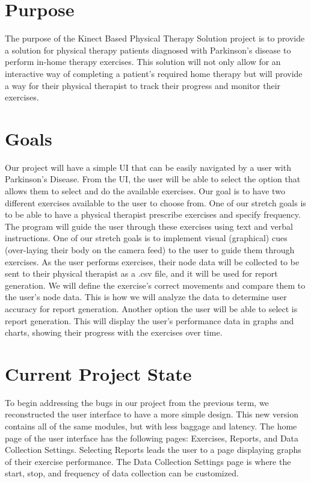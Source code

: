 \documentclass[onecolumn, draftclsnofoot,10pt, compsoc]{IEEEtran}
\begin{document}
\section{Purpose}
The purpose of the Kinect Based Physical Therapy Solution project is to provide a solution for physical therapy patients diagnosed with Parkinson's disease to perform in-home therapy exercises. This solution will not only allow for an interactive way of completing a patient's required home therapy but will provide a way for their physical therapist to track their progress and monitor their exercises.

\section{Goals}
Our project will have a simple UI that can be easily navigated by a user with Parkinson's Disease. From the UI, the user will be able to select the option that allows them to select and do the available exercises. Our goal is to have two different exercises available to the user to choose from. One of our stretch goals is to be able to have a physical therapist prescribe exercises and specify frequency. The program will guide the user through these exercises using text and verbal instructions. One of our stretch goals is to implement visual (graphical) cues (over-laying their body on the camera feed) to the user to guide them through exercises. As the user performs exercises, their node data will be collected to be sent to their physical therapist as a .csv file, and it will be used for report generation. We will define the exercise's correct movements and compare them to the user's node data. This is how we will analyze the data to determine user accuracy for report generation. Another option the user will be able to select is report generation. This will display the user's performance data in graphs and charts, showing their progress with the exercises over time. 

\section{Current Project State}
To begin addressing the bugs in our project from the previous term, we reconstructed the user interface to have a more simple design. This new version contains all of the same modules, but with less baggage and latency. The home page of the user interface has the following pages: Exercises, Reports, and Data Collection Settings. Selecting Reports leads the user to a page displaying graphs of their exercise performance. The Data Collection Settings page is where the start, stop, and frequency of data collection can be customized.
\end{document}
